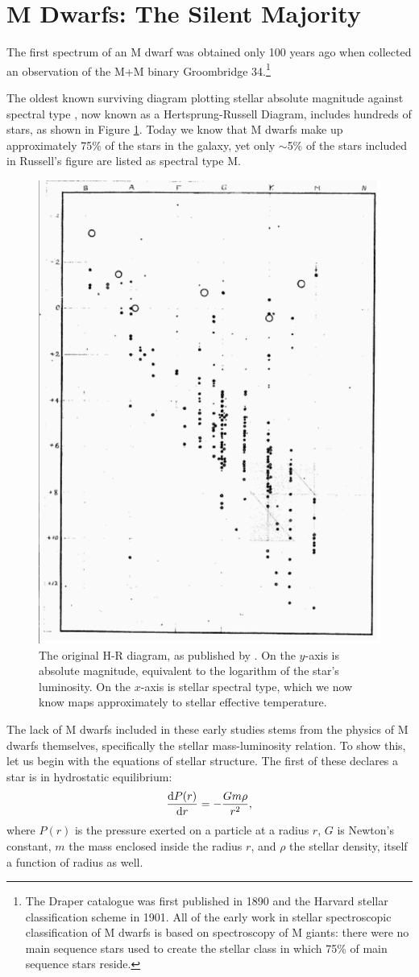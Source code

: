 \section{M Dwarfs: The Silent Majority}
The first spectrum of an M dwarf was obtained only 100 years ago when 
\citet{Adams13} collected an observation of the M+M binary Groombridge 34.\footnote{The
Draper catalogue was first published in 1890 and the
Harvard stellar classification scheme in 1901. 
All of the early work in stellar spectroscopic classification of M dwarfs is based on
spectroscopy of M giants: there were no main sequence stars used to create the stellar class in which 
75\% of main sequence stars reside.}

The oldest known surviving diagram plotting stellar absolute magnitude against spectral type \citep{Russell14}, now known as a Hertsprung-Russell Diagram, includes hundreds of stars, as shown in Figure \ref{fig:HR}.
Today we know that M dwarfs make up approximately 75\% of the stars in the galaxy,
yet only $\sim$5\% of the stars included in Russell's figure are listed as
spectral type M.



\begin{figure}[hbt!]
\centering
\includegraphics[width=.5\textwidth]{chapter1/hr.png}
\caption[Russell's original H-R Diagram]{The original H-R diagram, as published by
\citet{Russell14}. On the $y$-axis is absolute magnitude, equivalent to the logarithm
of the star's luminosity. On the $x$-axis is stellar spectral type, which we now know
maps approximately to stellar effective temperature.}
\label{fig:HR}
\end{figure}

The lack of M dwarfs included in these early studies stems from the physics
of M dwarfs themselves, specifically the stellar mass-luminosity relation.
To show this, let us begin with the equations of stellar structure.
The first of these declares a star is in hydrostatic equilibrium:
\begin{equation}
\frac{\operatorname{d}\!{P}(r)}{\operatorname{d}\!{r}} = - \frac{ G m \rho}{r^2 },
\label{eq:hydro}
\end{equation}
where $P(r)$ is the pressure exerted on a particle at a radius $r$, $G$ is Newton's
constant, $m$ the mass enclosed inside the radius $r$, and $\rho$ the stellar density,
itself a function of radius as well.

